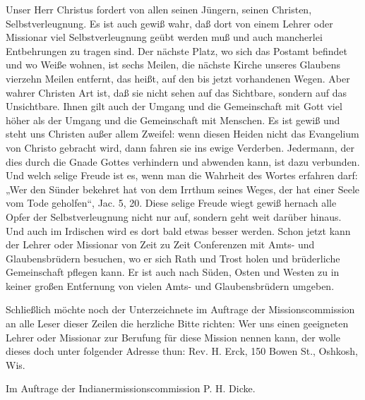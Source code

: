 Unser Herr Christus fordert von allen seinen Jüngern, seinen Christen, Selbstverleugnung. Es ist auch gewiß wahr, daß dort von einem Lehrer oder Missionar viel Selbstverleugnung geübt werden muß und auch mancherlei Entbehrungen zu tragen sind. Der nächste Platz, wo sich das Postamt befindet und wo Weiße wohnen, ist sechs Meilen, die nächste Kirche unseres Glaubens vierzehn Meilen entfernt, das heißt, auf den bis jetzt vorhandenen Wegen. Aber wahrer Christen Art ist, daß sie nicht sehen auf das Sichtbare, sondern auf das Unsichtbare. Ihnen gilt auch der Umgang und die Gemeinschaft mit Gott viel höher als der Umgang und die Gemeinschaft mit Menschen. Es ist gewiß und steht uns Christen außer allem Zweifel: wenn diesen Heiden nicht das Evangelium von Christo gebracht wird, dann fahren sie ins ewige Verderben. Jedermann, der dies durch die Gnade Gottes verhindern und abwenden kann, ist dazu verbunden. Und welch selige Freude ist es, wenn man die Wahrheit des Wortes erfahren darf: „Wer den Sünder bekehret hat von dem Irrthum seines Weges, der hat einer Seele vom Tode geholfen“, Jac. 5, 20. Diese selige Freude wiegt gewiß hernach alle Opfer der Selbstverleugnung nicht nur auf, sondern geht weit darüber hinaus. Und auch im Irdischen wird es dort bald etwas besser werden. Schon jetzt kann der Lehrer oder Missionar von Zeit zu Zeit Conferenzen mit Amts- und Glaubensbrüdern besuchen, wo er sich Rath und Trost holen und brüderliche Gemeinschaft pflegen kann. Er ist auch nach Süden, Osten und Westen zu in keiner großen Entfernung von vielen Amts- und Glaubensbrüdern umgeben.

Schließlich möchte noch der Unterzeichnete im Auftrage der Missionscommission an alle Leser dieser Zeilen die herzliche Bitte richten: Wer uns einen geeigneten Lehrer oder Missionar zur Berufung für diese Mission nennen kann, der wolle dieses doch unter folgender Adresse thun: Rev. H. Erck, 150 Bowen St., Oshkosh, Wis.

Im Auftrage der Indianermissionscommission
P. H. Dicke.
